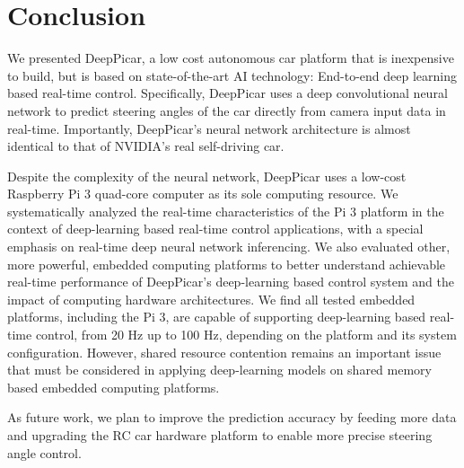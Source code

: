 \section{Conclusion}\label{sec:conclusion}
We presented DeepPicar, a low cost autonomous car platform that is
inexpensive to build, but is based on state-of-the-art AI technology:
End-to-end deep learning based real-time control.
Specifically, DeepPicar uses a deep convolutional neural network to
predict steering angles of the car directly from camera input data
in real-time. Importantly, DeepPicar's neural network architecture is
almost identical to that of NVIDIA's real self-driving car. 

Despite the complexity of the neural network, DeepPicar uses a
low-cost Raspberry Pi 3 quad-core computer as its sole computing
resource. We systematically analyzed the real-time characteristics of
the Pi 3 platform in the context of deep-learning based real-time
control applications, with a special emphasis on real-time deep neural
network inferencing.
We also evaluated other, more powerful, embedded computing
platforms to better understand achievable real-time performance of
DeepPicar's deep-learning based control system and the impact of
computing hardware architectures.
We find all tested embedded platforms, including the Pi 3, are capable
of supporting deep-learning based real-time control, from 20 Hz up to
100 Hz, depending on the platform and its system
configuration. However, shared resource contention remains an
important issue that must be considered in applying deep-learning
models on shared memory based embedded computing platforms.

As future work, 
we plan to improve the prediction accuracy by feeding more data and
upgrading the RC car hardware platform to enable more precise steering
angle control.